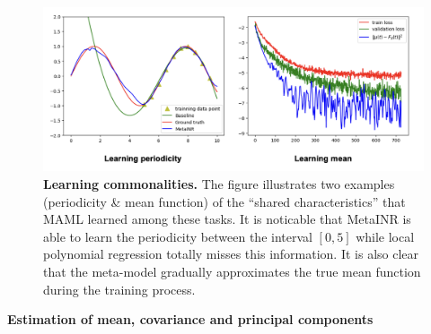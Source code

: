 \documentclass{article}
\begin{document}
\begin{figure}[htb]
  \centering
  \includegraphics[width=\textwidth]{learning_commonalities.png}
  \caption{\textbf{Learning commonalities.} The figure illustrates two examples (periodicity \& mean function) of the ``shared characteristics'' that MAML learned among these tasks. 
  It is noticable that MetaINR is able to learn the periodicity between the interval $[0,5]$ while local polynomial regression totally misses this information. It is also clear that the meta-model gradually approximates the true mean function during the training process. }
  \label{Learning commonalities}
\end{figure}




\textbf{Estimation of mean, covariance and principal components}
\end{document}
